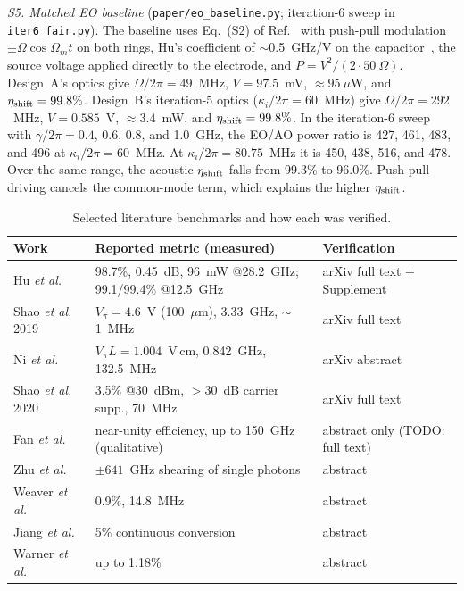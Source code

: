 \documentclass[aps,prl,reprint,superscriptaddress,amsmath,amssymb,floatfix]{revtex4-2}
\newcommand{\etash}{\eta_{\rm shift}}
\begin{document}
\emph{S5. Matched EO baseline} (\texttt{paper/eo\_baseline.py}; iteration-6 sweep in \texttt{iter6\_fair.py}). The baseline uses Eq.~(S2) of Ref.~\cite{Hu2021} with push-pull modulation $\pm\Omega\cos\Omega_m t$ on both rings, Hu's coefficient of $\sim$0.5~GHz/V on the capacitor~\cite{Hu2021}, the source voltage applied directly to the electrode, and $P=V^2/(2\cdot50~\Omega)$. Design~A's optics give $\Omega/2\pi=49$~MHz, $V=97.5$~mV, $\approx95~\mu$W, and $\etash=99.8\%$. Design~B's iteration-5 optics ($\kappa_i/2\pi=60$~MHz) give $\Omega/2\pi=292$~MHz, $V=0.585$~V, $\approx3.4$~mW, and $\etash=99.8\%$. In the iteration-6 sweep with $\gamma/2\pi=0.4$, 0.6, 0.8, and 1.0~GHz, the EO/AO power ratio is 427, 461, 483, and 496 at $\kappa_i/2\pi=60$~MHz. At $\kappa_i/2\pi=80.75$~MHz it is 450, 438, 516, and 478. Over the same range, the acoustic $\etash$ falls from 99.3\% to 96.0\%. Push-pull driving cancels the common-mode term, which explains the higher $\etash$.

\begin{table}[h]
\caption{Selected literature benchmarks and how each was verified.}
\begin{ruledtabular}
\begin{tabular}{p{4.2cm}p{6.6cm}p{5.4cm}}
Work & Reported metric (measured) & Verification\\
\hline
Hu \emph{et al.}~\cite{Hu2021} & 98.7\%, 0.45~dB, 96~mW @28.2~GHz; 99.1/99.4\% @12.5~GHz & arXiv full text + Supplement\\
Shao \emph{et al.} 2019~\cite{Shao2019} & $V_\pi=4.6$~V (100~$\mu$m), 3.33~GHz, $\sim$1~MHz & arXiv full text\\
Ni \emph{et al.}~\cite{Ni2026} & $V_\pi L=1.004$~V\,cm, 0.842~GHz, 132.5~MHz & arXiv abstract\\
Shao \emph{et al.} 2020~\cite{Shao2020} & 3.5\% @30~dBm, $>$30~dB carrier supp., 70~MHz & arXiv full text\\
Fan \emph{et al.}~\cite{Fan2016} & near-unity efficiency, up to 150~GHz (qualitative) & abstract only (TODO: full text)\\
Zhu \emph{et al.}~\cite{Zhu2022} & $\pm641$~GHz shearing of single photons & abstract\\
Weaver \emph{et al.}~\cite{Weaver2024} & 0.9\%, 14.8~MHz & abstract\\
Jiang \emph{et al.}~\cite{Jiang2023} & 5\% continuous conversion & abstract\\
Warner \emph{et al.}~\cite{Warner2025} & up to 1.18\% & abstract\\
\end{tabular}
\end{ruledtabular}
\end{table}
\end{document}
